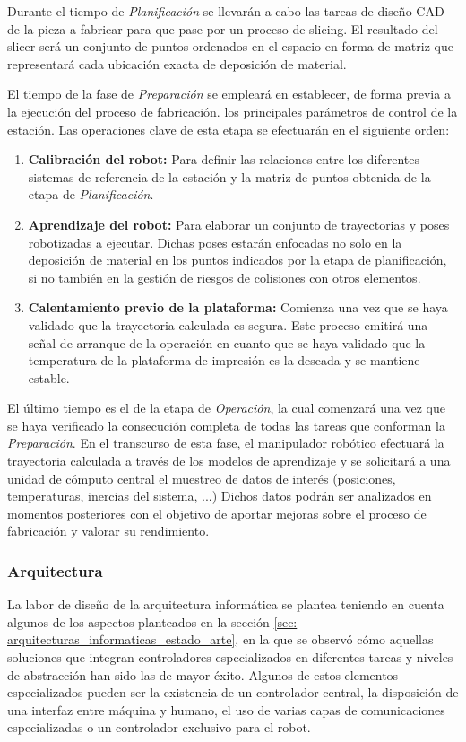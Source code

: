 Durante el tiempo de \textit{Planificación} se llevarán a cabo las tareas de diseño \acrshort{CAD} de la pieza a fabricar para que pase por un proceso de slicing. El resultado del slicer será un conjunto de puntos ordenados en el espacio en forma de matriz que representará cada ubicación exacta de deposición de material.

El tiempo de la fase de \textit{Preparación} se empleará en establecer, de forma previa a la ejecución del proceso de fabricación. los principales parámetros de control de la estación. Las operaciones clave de esta etapa se efectuarán en el siguiente orden: 
    \begin{enumerate}
        \item \textbf{Calibración del robot:} Para definir las relaciones entre los diferentes sistemas de referencia de la estación y la matriz de puntos obtenida de la etapa de \textit{Planificación}.
        \item \textbf{Aprendizaje del robot:} Para elaborar un conjunto de trayectorias y poses robotizadas a ejecutar. Dichas poses estarán enfocadas no solo en la deposición de material en los puntos indicados por la etapa de planificación, si no también en la gestión de riesgos de colisiones con otros elementos.
        \item \textbf{Calentamiento previo de la plataforma:} Comienza una vez que se haya validado que la trayectoria calculada es segura. Este proceso emitirá una señal de arranque de la operación en cuanto que se haya validado que la temperatura de la plataforma de impresión es la deseada y se mantiene estable.
    \end{enumerate}

El último tiempo es el de la etapa de \textit{Operación}, la cual comenzará una vez que se haya verificado la consecución completa de todas las tareas que conforman la \textit{Preparación}. En el transcurso de esta fase, el manipulador robótico efectuará la trayectoria calculada a través de los modelos de aprendizaje y se solicitará a una unidad de cómputo central el muestreo de datos de interés (posiciones, temperaturas, inercias del sistema, ...) Dichos datos podrán ser analizados en momentos posteriores con el objetivo de aportar mejoras sobre el proceso de fabricación y valorar su rendimiento.

\subsubsection*{Arquitectura}
\hypertarget{Arquitectura}{}
La labor de diseño de la arquitectura informática se plantea teniendo en cuenta algunos de los aspectos planteados en la sección \ref{sec: arquitecturas_informaticas_estado_arte}, en la que se observó cómo aquellas soluciones que integran controladores especializados en diferentes tareas y niveles de abstracción han sido las de mayor éxito. Algunos de estos elementos especializados pueden ser la existencia de un controlador central, la disposición de una interfaz entre máquina y humano, el uso de varias capas de comunicaciones especializadas o un controlador exclusivo para el robot.

